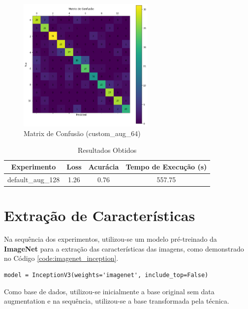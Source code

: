 \documentclass[12pt]{article}
\begin{document}
\begin{figure}[!htb]
  \centering
  \includegraphics[width=18em]{experiments/lenet5_aug_128/confusion_matrix.png}
  \caption{Matrix de Confusão (custom\_aug\_64)}
  \label{fig:experiment_lenet5_aug_128_confusion_matrix}
\end{figure}

\begin{table}[!htb]
  \centering
  \begin{tabular}{|c|c|c|c|}
    \hline
    \textbf{Experimento} & \textbf{Loss} & \textbf{Acurácia} & \textbf{Tempo de Execução (s)} \\ \hline
    default\_aug\_128    & 1.26          & 0.76              & 557.75                         \\ \hline
  \end{tabular}
  \caption{Resultados Obtidos}
  \label{tab:experiment_lenet_aug_128_reults}
\end{table}

\section{Extração de Características}

Na sequência dos experimentos, utilizou-se um modelo pré-treinado da \textbf{ImageNet} para a extração das características das imagens, como demonstrado no Código \ref{code:imagenet_inception}.

\begin{lstlisting}[caption={ImageNet - InceptionV3},captionpos=b,frame=single,label={code:imagenet_inception}]
model = InceptionV3(weights='imagenet', include_top=False)
\end{lstlisting}

Como base de dados, utilizou-se inicialmente a base original sem data augmentation e na sequência, utilizou-se a base transformada pela técnica.
\end{document}
